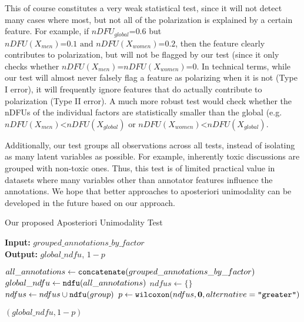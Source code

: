 This of course constitutes a very weak statistical test, since it will not detect many cases where most, but not all of the polarization is explained by a certain feature. For example, if $nDFU_{global} \text{=} 0.6$ but  $nDFU(X_{men}) \text{=} 0.1 \text{ and } nDFU(X_{women}) \text{=} 0.2$, then the feature clearly contributes to polarization, but will not be flagged by our test (since it only checks whether $nDFU(X_{men}) \text{=} nDFU(X_{women}) \text{=} 0$. In technical terms, while our test will almost never falsely flag a feature as polarizing when it is not (Type I error), it will frequently ignore features that do actually contribute to polarization (Type II error). A much more robust test would check whether the \acp{nDFU} of the individual factors are statistically smaller than the global (e.g. $nDFU(X_{men}) \text{<} nDFU(X_{global}) \text{ or } nDFU(X_{women}) \text{<} nDFU(X_{global})$.

Additionally, our test groups all observations across all tests, instead of isolating as many latent variables as possible. For example, inherently toxic discussions are grouped with non-toxic ones. Thus, this test is of limited practical value in datasets where many variables other than annotator features influence the annotations. We hope that better approaches to aposteriori unimodality can be developed in the future based on our approach.

\begin{algorithm}
	\caption{Our proposed Aposteriori Unimodality Test}
	\label{al:aposteriori_unimodality}
	\hspace*{\algorithmicindent} \textbf{Input:} $grouped\_annotations\_by\_factor$  \\
	\hspace*{\algorithmicindent} \textbf{Output:} $global\_ndfu$, $1 - p$ 
	\begin{algorithmic}[1]
		\State $all\_annotations \gets \texttt{concatenate}(grouped\_annotations\_by\_factor)$ 
		\State $global\_ndfu \gets \texttt{ndfu}(all\_annotations)$ 
		\State
		\State $ndfus \gets \{\}$
		\State $ndfus \gets  ndfus \cup \texttt{ndfu}(group)$ 
		\EndFor
		\State
		\State $p \gets \texttt{wilcoxon}(ndfus, \mathbf{0}, alternative=\texttt{"greater"})$
		
		\State \Return $(global\_ndfu, 1 - p)$
	\end{algorithmic}
\end{algorithm}

